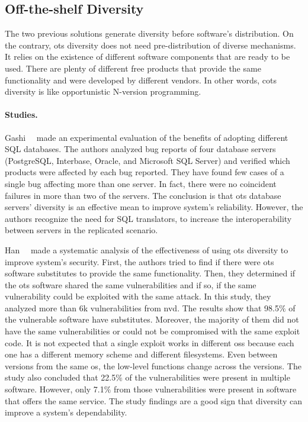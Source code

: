 \subsection{Off-the-shelf Diversity}
The two previous solutions generate diversity before software’s distribution. 
On the contrary, \gls{ots} diversity does not need pre-distribution of diverse mechanisms. 
It relies on the existence of different software components that are ready to be used.
There are plenty of different free products that provide the same functionality and were developed by different vendors. 
In other words, \gls{cots} diversity is like opportunistic N-version programming.




\paragraph{Studies.}
Gashi~\etal{}~\cite{Gashi:2007} made an experimental evaluation of the benefits of adopting different SQL databases. 
The authors analyzed bug reports of four database servers (PostgreSQL, Interbase, Oracle, and Microsoft SQL Server) and verified which products were affected by each bug reported. 
They have found few cases of a single bug affecting more than one server. 
In fact, there were no coincident failures in more than two of the servers.
The conclusion is that \gls{ots} database servers’ diversity is an effective mean to improve system's reliability. 
However, the authors recognize the need for SQL translators, to increase the interoperability between servers in the replicated scenario.

Han~\etal{}~\cite{Han:2009} made a systematic analysis of the effectiveness of using \gls{ots} diversity to improve system's security. 
First, the authors tried to find if there were \gls{ots} software substitutes to provide the same functionality. 
Then, they determined if the \gls{ots} software shared the same vulnerabilities and if so, if the same vulnerability could be exploited with the same attack. 
In this study, they analyzed more than 6k vulnerabilities from \gls{nvd}. 
The results show that 98.5$\%$ of the vulnerable software have substitutes. 
Moreover, the majority of them did not have the same vulnerabilities or could not be compromised with the same exploit code. 
It is not expected that a single exploit works in different \glspl{os} because each one has a different memory scheme and different filesystems. 
Even between versions from the same \gls{os}, the low-level functions change across the versions. 
The study also concluded that 22.5$\%$ of the vulnerabilities were present in multiple software. 
However, only 7.1$\%$ from those vulnerabilities were present in software that offers the same service. 
The study findings are a good sign that diversity can improve a system’s dependability.


